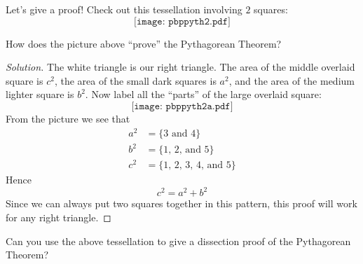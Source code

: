 \documentclass{ximera}
\begin{document}
Let's give a proof! Check out this tessellation involving $2$ squares:
\[
\texttt{[image: pbppyth2.pdf]}
\]
\begin{question} How does the picture above ``prove'' the Pythagorean Theorem?
\end{question}
\begin{proof}[Solution]  
The white triangle is our right triangle. The area of the middle
overlaid square is $c^2$, the area of the small dark squares is $a^2$,
and the area of the medium lighter square is $b^2$. Now label all the
``parts'' of the large overlaid square:
\[
\texttt{[image: pbppyth2a.pdf]}
\]
From the picture we see that
\begin{align*}
a^2 &= \{\text{3 and 4}\}\\
b^2 &= \{\text{1, 2, and 5}\}\\
c^2 &= \{\text{1, 2, 3, 4, and 5}\}
\end{align*}
Hence
\[
c^2 = a^2 + b^2
\]
Since we can always put two squares together in this pattern, this
proof will work for any right triangle.
\end{proof}

\begin{question} Can you use the above tessellation to give a dissection proof of the Pythagorean Theorem?
\end{question}
\end{document}
